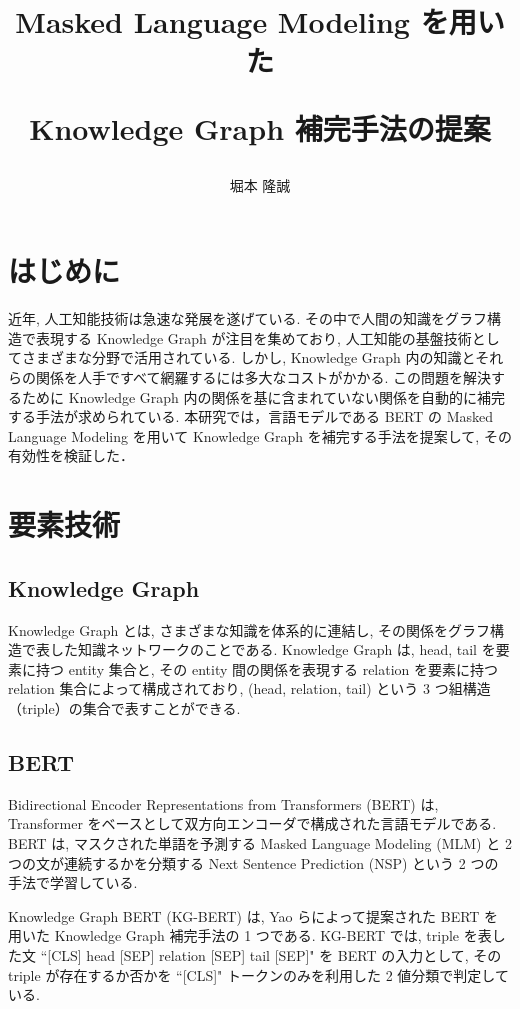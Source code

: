 \documentclass[a4paper,twoside,twocolumn,10pt]{article}
\title{Masked Language Modeling を用いた\par Knowledge Graph 補完手法の提案}
\author{堀本 隆誠}
\begin{document}
\maketitle %
\small

\section{はじめに}

近年, 人工知能技術は急速な発展を遂げている. その中で人間の知識をグラフ構造で表現する Knowledge Graph \cite{kg} が注目を集めており, 人工知能の基盤技術としてさまざまな分野で活用されている. しかし, Knowledge Graph 内の知識とそれらの関係を人手ですべて網羅するには多大なコストがかかる. この問題を解決するために Knowledge Graph 内の関係を基に含まれていない関係を自動的に補完する手法が求められている. 本研究では，言語モデルである BERT の Masked Language Modeling を用いて Knowledge Graph を補完する手法を提案して, その有効性を検証した．\par

\vspace{-1mm}
\section{要素技術}

\subsection{Knowledge Graph}

Knowledge Graph \cite{kg} とは, さまざまな知識を体系的に連結し, その関係をグラフ構造で表した知識ネットワークのことである. Knowledge Graph は, head, tail を要素に持つ entity 集合と, その entity 間の関係を表現する relation を要素に持つ relation 集合によって構成されており, (head, relation, tail) という 3 つ組構造（triple）の集合で表すことができる. \par

\vspace{-1mm}
\subsection{BERT}

Bidirectional Encoder Representations from Transformers (BERT) \cite{BERT} は, Transformer をベースとして双方向エンコーダで構成された言語モデルである. BERT は, マスクされた単語を予測する Masked Language Modeling (MLM) と 2 つの文が連続するかを分類する Next Sentence Prediction (NSP) という 2 つの手法で学習している. \par
Knowledge Graph BERT (KG-BERT) \cite{KG-BERT} は, Yao らによって提案された BERT を用いた Knowledge Graph 補完手法の 1 つである. KG-BERT では, triple を表した文 ``[CLS] head [SEP] relation [SEP] tail [SEP]" を  BERT の入力として, その triple が存在するか否かを ``[CLS]" トークンのみを利用した 2 値分類で判定している. \par
\end{document}
